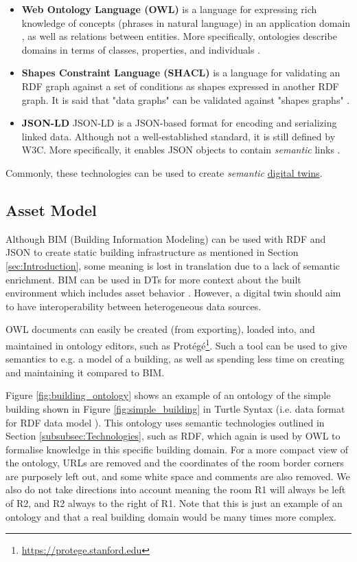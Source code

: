 \documentclass{article}
\begin{document}
\begin{itemize}
    \item \textbf{Web Ontology Language (OWL)} is a language for expressing rich knowledge of concepts (phrases in natural language) in an application domain \cite{szolovits_overview_1977}, as well as relations between entities. More specifically, ontologies describe domains in terms of classes, properties, and individuals \cite{bechhofer_owl_2009}.

    \item \textbf{Shapes Constraint Language (SHACL)} is a language for validating an RDF graph against a set of conditions as shapes expressed in another RDF graph. It is said that "data graphs" can be validated against "shapes graphs" \cite{noauthor_shapes_nodate}.
    
    \item \textbf{JSON-LD} JSON-LD is a JSON-based format for encoding and serializing linked data. Although not a well-established standard, it is still defined by W3C.  More specifically, it enables JSON objects to contain \emph{semantic} links \cite{noauthor_json-based_nodate}.
\end{itemize}

Commonly, these technologies can be used to create \emph{semantic} \hyperref[subsec:DigitalTwins]{digital twins}.

\subsection{Asset Model}\label{subsec:AssetModel}
Although BIM (Building Information Modeling) can be used with RDF and JSON to create static building infrastructure as mentioned in Section \ref{sec:Introduction}, some meaning is lost in translation due to a lack of semantic enrichment. BIM can be used in DTs for more context about the built environment which includes asset behavior \cite{godager_concept_2021}. However, a digital twin should aim to have interoperability between heterogeneous data sources.

OWL documents can easily be created (from exporting), loaded into, and maintained in ontology editors, such as Protégé\footnote{\url{https://protege.stanford.edu}}. Such a tool can be used to give semantics to e.g. a model of a building, as well as spending less time on creating and maintaining it compared to BIM. 

Figure \ref{fig:building_ontology} shows an example of an ontology of the simple building shown in Figure \ref{fig:simple_building} in Turtle Syntax (i.e. data format for RDF data model \cite{noauthor_terse_nodate}). This ontology uses semantic technologies outlined in Section \ref{subsubsec:Technologies}, such as RDF, which again is used by OWL to formalise knowledge in this specific building domain. For a more compact view of the ontology, URLs are removed and the coordinates of the room border corners are purposely left out, and some white space and comments are also removed. We also do not take directions into account meaning the room R1 will always be left of R2, and R2 always to the right of R1. Note that this is just an example of an ontology and that a real building domain would be many times more complex.
\end{document}
